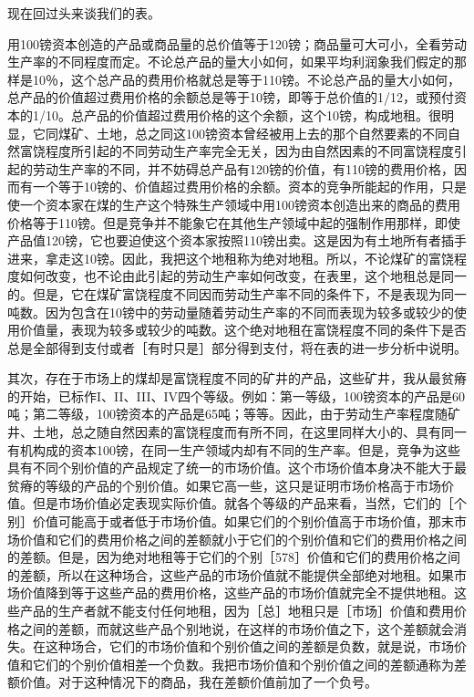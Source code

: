 现在回过头来谈我们的表。

用100镑资本创造的产品或商品量的总价值等于120镑；商品量可大可小，全看劳动生产率的不同程度而定。不论总产品的量大小如何，如果平均利润象我们假定的那样是10％，这个总产品的费用价格就总是等于110镑。不论总产品的量大小如何，总产品的价值超过费用价格的余额总是等于10镑，即等于总价值的1/12，或预付资本的1/10。总产品的价值超过费用价格的这个余额，这个10镑，构成地租。很明显，它同煤矿、土地，总之同这100镑资本曾经被用上去的那个自然要素的不同自然富饶程度所引起的不同劳动生产率完全无关，因为由自然因素的不同富饶程度引起的劳动生产率的不同，并不妨碍总产品有120镑的价值，有110镑的费用价格，因而有一个等于10镑的、价值超过费用价格的余额。资本的竞争所能起的作用，只是使一个资本家在煤的生产这个特殊生产领域中用100镑资本创造出来的商品的费用价格等于110镑。但是竞争并不能象它在其他生产领域中起的强制作用那样，即使产品值120镑，它也要迫使这个资本家按照110镑出卖。这是因为有土地所有者插手进来，拿走这10镑。因此，我把这个地租称为绝对地租。所以，不论煤矿的富饶程度如何改变，也不论由此引起的劳动生产率如何改变，在表里，这个地租总是同一的。但是，它在煤矿富饶程度不同因而劳动生产率不同的条件下，不是表现为同一吨数。因为包含在10镑中的劳动量随着劳动生产率的不同而表现为较多或较少的使用价值量，表现为较多或较少的吨数。这个绝对地租在富饶程度不同的条件下是否总是全部得到支付或者［有时只是］部分得到支付，将在表的进一步分析中说明。

其次，存在于市场上的煤却是富饶程度不同的矿井的产品，这些矿井，我从最贫瘠的开始，已标作I、II、III、IV四个等级。例如：第一等级，100镑资本的产品是60吨；第二等级，100镑资本的产品是65吨；等等。因此，由于劳动生产率程度随矿井、土地，总之随自然因素的富饶程度而有所不同，在这里同样大小的、具有同一有机构成的资本100镑，在同一生产领域内却有不同的生产率。但是，竞争为这些具有不同个别价值的产品规定了统一的市场价值。这个市场价值本身决不能大于最贫瘠的等级的产品的个别价值。如果它高一些，这只是证明市场价格高于市场价值。但是市场价值必定表现实际价值。就各个等级的产品来看，当然，它们的［个别］价值可能高于或者低于市场价值。如果它们的个别价值高于市场价值，那末市场价值和它们的费用价格之间的差额就小于它们的个别价值和它们的费用价格之间的差额。但是，因为绝对地租等于它们的个别［578］价值和它们的费用价格之间的差额，所以在这种场合，这些产品的市场价值就不能提供全部绝对地租。如果市场价值降到等于这些产品的费用价格，这些产品的市场价值就完全不提供地租。这些产品的生产者就不能支付任何地租，因为［总］地租只是［市场］价值和费用价格之间的差额，而就这些产品个别地说，在这样的市场价值之下，这个差额就会消失。在这种场合，它们的市场价值和个别价值之间的差额是负数，就是说，市场价值和它们的个别价值相差一个负数。我把市场价值和个别价值之间的差额通称为差额价值。对于这种情况下的商品，我在差额价值前加了一个负号。


